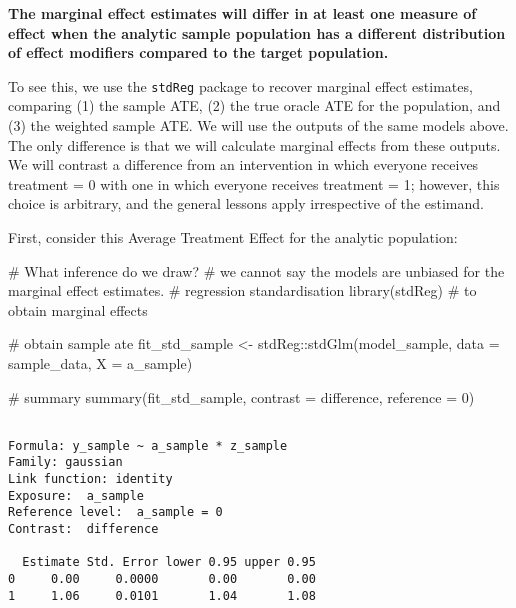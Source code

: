 \documentclass[
  single column]{article}
\newenvironment{Shaded}{\begin{snugshade}}{\end{snugshade}}
\newcommand{\AttributeTok}[1]{\textcolor[rgb]{0.40,0.45,0.13}{#1}}
\newcommand{\CommentTok}[1]{\textcolor[rgb]{0.37,0.37,0.37}{#1}}
\newcommand{\DecValTok}[1]{\textcolor[rgb]{0.68,0.00,0.00}{#1}}
\newcommand{\FunctionTok}[1]{\textcolor[rgb]{0.28,0.35,0.67}{#1}}
\newcommand{\NormalTok}[1]{\textcolor[rgb]{0.00,0.23,0.31}{#1}}
\newcommand{\OtherTok}[1]{\textcolor[rgb]{0.00,0.23,0.31}{#1}}
\newcommand{\SpecialCharTok}[1]{\textcolor[rgb]{0.37,0.37,0.37}{#1}}
\newcommand{\StringTok}[1]{\textcolor[rgb]{0.13,0.47,0.30}{#1}}
\begin{document}
\textbf{The marginal effect estimates will differ in at least one
measure of effect when the analytic sample population has a different
distribution of effect modifiers compared to the target population.}

To see this, we use the \texttt{stdReg} package to recover marginal
effect estimates, comparing (1) the sample ATE, (2) the true oracle ATE
for the population, and (3) the weighted sample ATE. We will use the
outputs of the same models above. The only difference is that we will
calculate marginal effects from these outputs. We will contrast a
difference from an intervention in which everyone receives treatment = 0
with one in which everyone receives treatment = 1; however, this choice
is arbitrary, and the general lessons apply irrespective of the
estimand.

First, consider this Average Treatment Effect for the analytic
population:

\begin{Shaded}
\begin{Highlighting}[]
\CommentTok{\# What inference do we draw?  }
\CommentTok{\# we cannot say the models are unbiased for the marginal effect estimates. }
\CommentTok{\# regression standardisation }
\FunctionTok{library}\NormalTok{(stdReg) }\CommentTok{\# to obtain marginal effects }

\CommentTok{\# obtain sample ate}
\NormalTok{fit\_std\_sample }\OtherTok{\textless{}{-}}\NormalTok{ stdReg}\SpecialCharTok{::}\FunctionTok{stdGlm}\NormalTok{(model\_sample, }
  \AttributeTok{data =}\NormalTok{ sample\_data, }\AttributeTok{X =} \StringTok{\textquotesingle{}a\_sample\textquotesingle{}}\NormalTok{)}

\CommentTok{\# summary}
\FunctionTok{summary}\NormalTok{(fit\_std\_sample, }\AttributeTok{contrast =} \StringTok{\textquotesingle{}difference\textquotesingle{}}\NormalTok{, }\AttributeTok{reference =} \DecValTok{0}\NormalTok{)}
\end{Highlighting}
\end{Shaded}

\begin{verbatim}

Formula: y_sample ~ a_sample * z_sample
Family: gaussian 
Link function: identity 
Exposure:  a_sample 
Reference level:  a_sample = 0 
Contrast:  difference 

  Estimate Std. Error lower 0.95 upper 0.95
0     0.00     0.0000       0.00       0.00
1     1.06     0.0101       1.04       1.08
\end{verbatim}
\end{document}

